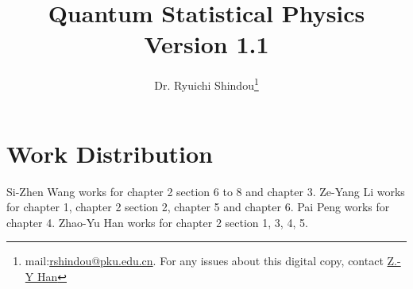 \documentclass[twoside]{book}
\numberwithin{equation}{section}
\begin{document}
\title{Quantum Statistical Physics\\\normalsize Version 1.1}
\author{Dr. Ryuichi Shindou\footnote{mail:\href{mailto:rshindou@pku.edu.cn}{rshindou@pku.edu.cn}. For any issues about this digital copy, contact \href{heinsius@pku.edu.cn}{Z.-Y Han}}}
\maketitle


\tableofcontents











\newpage

\chapter*{Work Distribution}
Si-Zhen Wang works for chapter 2 section 6 to 8 and chapter 3. Ze-Yang Li works for chapter 1, chapter 2 section 2, chapter 5 and chapter 6. Pai Peng works for chapter 4. Zhao-Yu Han works for chapter 2 section 1, 3, 4, 5. 
\end{document}
